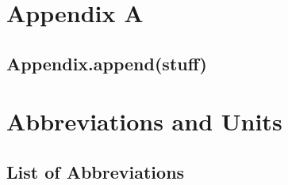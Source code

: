 
\appendix

\chapter{Appendix A}\label{sec:Appendix A}

\section{Appendix.append(stuff)}

\chapter{Abbreviations and Units}\label{sec:Appendix B}

\section{List of Abbreviations}

